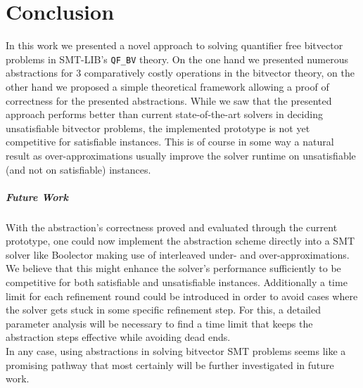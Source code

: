 \chapter{Conclusion}
\label{ch:Conclusion}
In this work we presented a novel approach to solving quantifier free bitvector problems in SMT-LIB's \texttt{QF\_BV} theory.
On the one hand we presented numerous abstractions for 3 comparatively costly operations in the bitvector theory, on the other hand we proposed a simple theoretical framework allowing a proof of correctness for the presented abstractions.
While we saw that the presented approach performs better than current state-of-the-art solvers in deciding unsatisfiable bitvector problems, the implemented prototype is not yet competitive for satisfiable instances. This is of course in some way a natural result as over-approximations usually improve the solver runtime on unsatisfiable (and not on satisfiable) instances.

\paragraph{Future Work}
With the abstraction's correctness proved and evaluated through the current prototype, one could now implement the abstraction scheme directly into a SMT solver like Boolector making use of interleaved under- and over-approximations. We believe that this might enhance the solver's performance sufficiently to be competitive for both satisfiable and unsatisfiable instances.
Additionally a time limit for each refinement round could be introduced in order to avoid cases where the solver gets stuck in some specific refinement step. For this, a detailed parameter analysis will be necessary to find a time limit that keeps the abstraction steps effective while avoiding dead ends.\\
In any case, using abstractions in solving bitvector SMT problems seems like a promising pathway that most certainly will be further investigated in future work.